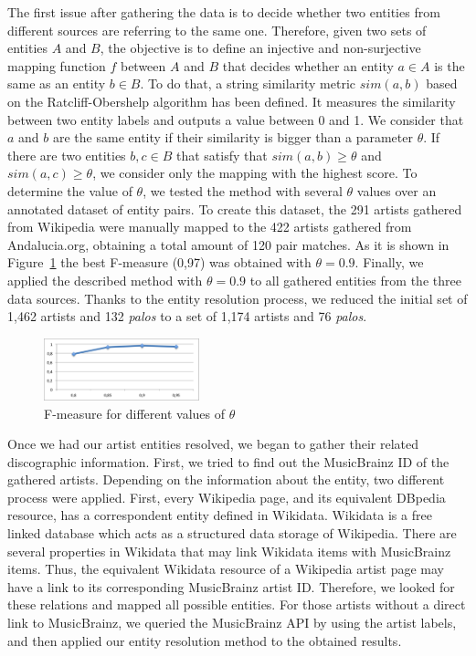 The first issue after gathering the data is to decide whether two entities from different sources are referring to the same one. Therefore, given two sets of entities $A$ and $B$, the objective is to define an injective and non-surjective mapping function $f$ between $A$ and $B$ that decides whether an entity $a \in A$ is the same as an entity $b \in B$. To do that, a string similarity metric $sim(a,b)$ based on the Ratcliff-Obershelp algorithm \cite{Ratcliff1988} has been defined. It measures the similarity between two entity labels and outputs a value between 0 and 1. We consider that $a$ and $b$ are the same entity if their similarity is bigger than a parameter $\theta$. If there are two entities $b, c \in B$ that satisfy that $sim(a,b) \geq \theta$ and $sim(a,c) \geq \theta$, we consider only the mapping with the highest score. To determine the value of $\theta$, we tested the method with several $\theta$ values over an annotated dataset of entity pairs. To create this dataset, the 291 artists gathered from Wikipedia were manually mapped to the 422 artists gathered from Andalucia.org, obtaining a total amount of 120 pair matches. As it is shown in Figure~\ref{fig:musicology:fmeasure} the best F-measure (0,97) was obtained with $\theta=0.9$. Finally, we applied the described method with $\theta=0.9$ to all gathered entities from the three data sources. Thanks to the entity resolution process, we reduced the initial set of 1,462 artists and 132 \textit{palos} to a set of 1,174 artists and 76 \textit{palos}.

\begin{figure}
	\centering
	\includegraphics[width=0.40\textwidth]{ch05_musicology_pics/similarity_f.png}
	\caption{F-measure for different values of $\theta$ \label{fig:musicology:fmeasure}}
\end{figure}

Once we had our artist entities resolved, we began to gather their related discographic information. First, we tried to find out the MusicBrainz ID of the gathered artists. Depending on the information about the entity, two different process were applied. First, every Wikipedia page, and its equivalent DBpedia resource, has a correspondent entity defined in Wikidata. Wikidata is a free linked database which acts as a structured data storage of Wikipedia. There are several properties in Wikidata that may link Wikidata items with MusicBrainz items. Thus, the equivalent Wikidata resource of a Wikipedia artist page may have a link to its corresponding MusicBrainz artist ID. Therefore, we looked for these relations and mapped all possible entities. For those artists without a direct link to MusicBrainz, we queried the MusicBrainz API by using the artist labels, and then applied our entity resolution method to the obtained results.

